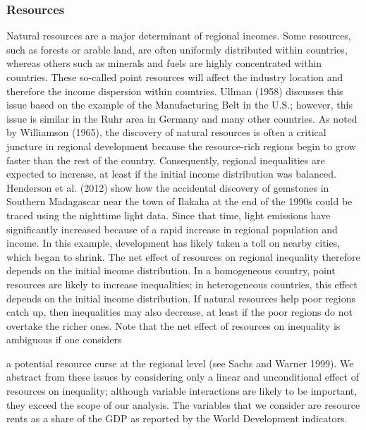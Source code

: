 \documentclass[10pt]{article}
\begin{document}
\subsubsection{Resources}
Natural resources are a major determinant of regional incomes. Some resources, such as forests or arable land, are often uniformly distributed within countries, whereas others such as minerals and fuels are highly concentrated within countries. These so-called point resources will affect the industry location and therefore the income dispersion within countries. Ullman (1958) discusses this issue based on the example of the Manufacturing Belt in the U.S.; however, this issue is similar in the Ruhr area in Germany and many other countries. As noted by Williamson (1965), the discovery of natural resources is often a critical juncture in regional development because the resource-rich regions begin to grow faster than the rest of the country. Consequently, regional inequalities are expected to increase, at least if the initial income distribution was balanced. Henderson et al. (2012) show how the accidental discovery of gemstones in Southern Madagascar near the town of Ilakaka at the end of the 1990s could be traced using the nighttime light data. Since that time, light emissions have significantly increased because of a rapid increase in regional population and income. In this example, development has likely taken a toll on nearby cities, which began to shrink. The net effect of resources on regional inequality therefore depends on the initial income distribution. In a homogeneous country, point resources are likely to increase inequalities; in heterogeneous countries, this effect depends on the initial income distribution. If natural resources help poor regions catch up, then inequalities may also decrease, at least if the poor regions do not overtake the richer ones. Note that the net effect of resources on inequality is ambiguous if one considers

a potential resource curse at the regional level (see Sachs and Warner 1999). We abstract from these issues by considering only a linear and unconditional effect of resources on inequality; although variable interactions are likely to be important, they exceed the scope of our analysis. The variables that we consider are resource rents as a share of the GDP as reported by the World Development indicators.
\end{document}
